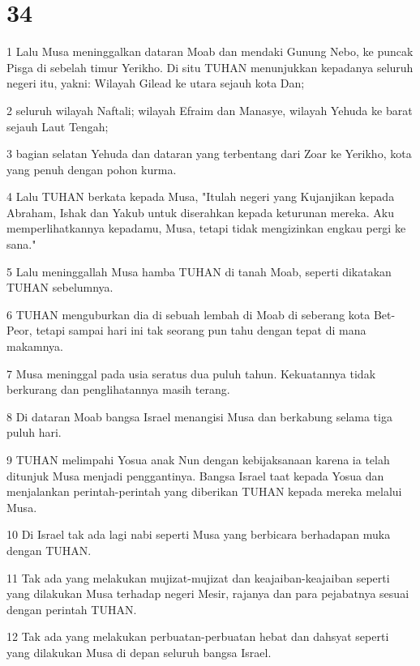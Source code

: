 \chapter{34}

\par 1 Lalu Musa meninggalkan dataran Moab dan mendaki Gunung Nebo, ke puncak Pisga di sebelah timur Yerikho. Di situ TUHAN menunjukkan kepadanya seluruh negeri itu, yakni: Wilayah Gilead ke utara sejauh kota Dan;
\par 2 seluruh wilayah Naftali; wilayah Efraim dan Manasye, wilayah Yehuda ke barat sejauh Laut Tengah;
\par 3 bagian selatan Yehuda dan dataran yang terbentang dari Zoar ke Yerikho, kota yang penuh dengan pohon kurma.
\par 4 Lalu TUHAN berkata kepada Musa, "Itulah negeri yang Kujanjikan kepada Abraham, Ishak dan Yakub untuk diserahkan kepada keturunan mereka. Aku memperlihatkannya kepadamu, Musa, tetapi tidak mengizinkan engkau pergi ke sana."
\par 5 Lalu meninggallah Musa hamba TUHAN di tanah Moab, seperti dikatakan TUHAN sebelumnya.
\par 6 TUHAN menguburkan dia di sebuah lembah di Moab di seberang kota Bet-Peor, tetapi sampai hari ini tak seorang pun tahu dengan tepat di mana makamnya.
\par 7 Musa meninggal pada usia seratus dua puluh tahun. Kekuatannya tidak berkurang dan penglihatannya masih terang.
\par 8 Di dataran Moab bangsa Israel menangisi Musa dan berkabung selama tiga puluh hari.
\par 9 TUHAN melimpahi Yosua anak Nun dengan kebijaksanaan karena ia telah ditunjuk Musa menjadi penggantinya. Bangsa Israel taat kepada Yosua dan menjalankan perintah-perintah yang diberikan TUHAN kepada mereka melalui Musa.
\par 10 Di Israel tak ada lagi nabi seperti Musa yang berbicara berhadapan muka dengan TUHAN.
\par 11 Tak ada yang melakukan mujizat-mujizat dan keajaiban-keajaiban seperti yang dilakukan Musa terhadap negeri Mesir, rajanya dan para pejabatnya sesuai dengan perintah TUHAN.
\par 12 Tak ada yang melakukan perbuatan-perbuatan hebat dan dahsyat seperti yang dilakukan Musa di depan seluruh bangsa Israel.


